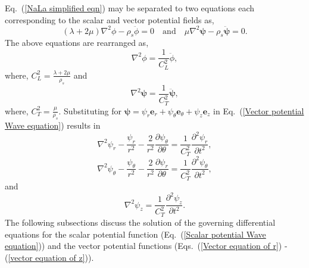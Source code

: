 \documentclass[twocolumn,10pt]{asme2ej}
\begin{document}
Eq.~(\ref{NaLa simplified eqn}) may be separated to two equations each corresponding to the scalar and vector potential fields as,
\begin{equation*}
    (\lambda+2\mu)\nabla^{2}\phi-\rho_s\ddot{\phi} = 0 \hspace{1em} \text{and} \hspace{1em} \mu\nabla^{2}\pmb{\psi}-\rho_s\ddot{\pmb{\psi}} = 0.
\end{equation*}
The above equations are rearranged as,
\begin{equation}\label{Scalar potential Wave equation}
    \nabla^{2}\phi = \frac{1}{C_{L}^{2}}\ddot{\phi},
\end{equation}
where, $C_{L}^{2} = \frac{\lambda+2\mu}{\rho_s}$ and
\begin{equation}\label{Vector potential Wave equation}
    \nabla^{2}\pmb{\psi} = \frac{1}{C_{T}^{2}}\ddot{\pmb{\psi}},
\end{equation}
where, $C_{T}^{2} = \frac{\mu}{\rho_s}$.
Substituting for $\pmb{\psi} = \psi_r\mathbf{e}_r + \psi_\theta\mathbf{e}_\theta + \psi_z\mathbf{e}_z$ in Eq.~(\ref{Vector potential Wave equation}) results in~\cite{achenbach2012}
 \begin{equation}\label{Vector equation of r}
     \nabla^{2}\psi_{r}-\frac{\psi_{r}}{r^{2}}-\frac{2}{r^{2}}\frac{\partial\psi_{\theta}}{\partial\theta} = \frac{1}{C_T^{2}}\frac{\partial^{2}\psi_{r}}{\partial t^{2}},
 \end{equation}
  \begin{equation}\label{vector equation of theta}
     \nabla^{2}\psi_{\theta}-\frac{\psi_{\theta}}{r^{2}}-\frac{2}{r^{2}}\frac{\partial\psi_{r}}{\partial\theta} = \frac{1}{C_T^{2}}\frac{\partial^{2}\psi_{\theta}}{\partial t^{2}},
 \end{equation}
 and
 \begin{equation}\label{vector equation of z}
     \nabla^{2}\psi_{z}= \frac{1}{C_T^{2}}\frac{\partial^{2}\psi_{z}}{\partial t^{2}}.
 \end{equation}
The following subsections discuss the solution of the governing differential equations for the scalar potential function (Eq.~(\ref{Scalar potential Wave equation})) and the vector potential functions (Eqs.~(\ref{Vector equation of r}) - (\ref{vector equation of z})).
\end{document}
